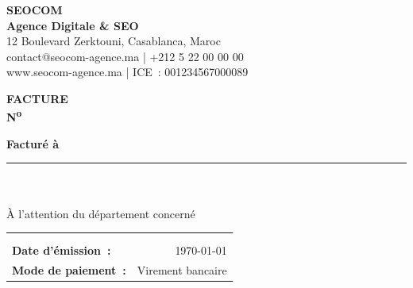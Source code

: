 \documentclass[11pt,a4paper]{article}
\begin{document}

\vspace{-1.35cm}
\noindent
\begin{minipage}[t]{0.55\textwidth}
  \vspace{0.4cm}
  {\color{white}\Huge \textbf{SEOCOM}}\\[2pt]
  {\color{seoaccent}\large \textbf{Agence Digitale \& SEO}}\\[10pt]
  {\color{white}\small
    12 Boulevard Zerktouni, Casablanca, Maroc\\
    contact@seocom-agence.ma \quad | \quad +212 5 22 00 00 00\\
    www.seocom-agence.ma \quad | \quad ICE~: 001234567000089
  }
\end{minipage}
\hfill
\begin{minipage}[t]{0.38\textwidth}
  \vspace{0.4cm}
  \raggedleft
  {\color{white}\LARGE \textbf{FACTURE}}\\[6pt]
  {\color{seoaccent}\Large \textbf{N\textsuperscript{o} }}
\end{minipage}

\vspace{0.7cm}

\noindent
\begin{minipage}[t]{0.48\textwidth}
  {\color{seoblue}\bfseries\large Facturé à}\\[4pt]
  {\color{seogray}\rule{3.5cm}{0.6pt}}\\[6pt]
  \textbf{}\\
  À l'attention du département concerné\\
\end{minipage}
\hfill
\begin{minipage}[t]{0.46\textwidth}
  \raggedleft
  \begin{tabularx}{\linewidth}{>{\raggedright\arraybackslash}X r}
    \multicolumn{2}{r}{\color{seoblue}\bfseries\large Détails} \\[2pt]
    \multicolumn{2}{r}{\color{seogray}\rule{3.5cm}{0.6pt}} \\[6pt]
    \textbf{Date d'émission~:} & \today \\[3pt]
    \textbf{Mode de paiement~:} & Virement bancaire \\[3pt]
  \end{tabularx}
\end{minipage}
\end{document}

